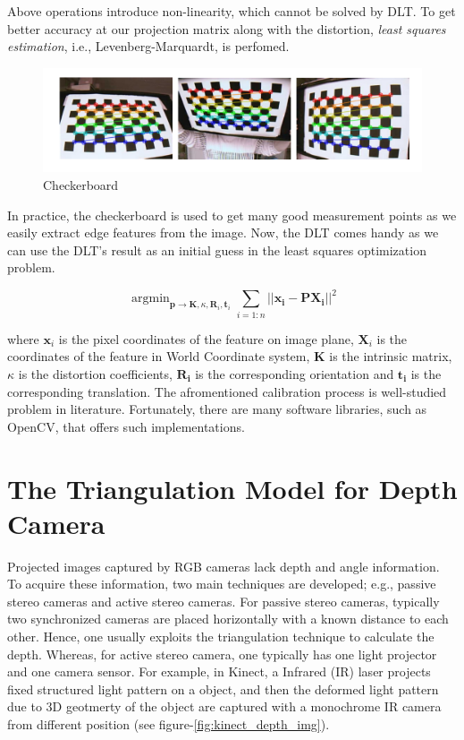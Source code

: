 \documentclass[a4paper]{report}
\numberwithin{figure}{section}
\newcommand{\argmin}{\mathop{\mathrm{argmin}}}
\begin{document}
Above operations introduce non-linearity, which cannot be solved by DLT.
To get better accuracy at our projection matrix along with the distortion, 
\textit{least squares estimation}, i.e., Levenberg-Marquardt, is perfomed.

\begin{figure}[H]
	\centering
  \includegraphics[width=\linewidth,natwidth=640,natheight=640]
  {fig/ref_imgs/checkerboard.png}
  \caption{Checkerboard}
  \label{fig:checkerboard}
\end{figure}

In practice, the checkerboard is used to get many good measurement points 
as  we easily extract edge features from the image. Now, the DLT comes handy
as we can use the DLT's result as an initial guess 
in the least squares optimization problem.

\begin{equation}
  \argmin_{\mathbf{p} \rightarrow \mathbf{K}, \kappa, \mathbf{R}_i, \mathbf{t}_i}
  \sum_{i=1:n} || \mathbf{x_{i}} - 
  \mathbf{P} \mathbf{X_{i}} ||^2
\end{equation}\label{eq:proj_lsq}

where 
$\mathbf{x}_i$ is the pixel coordinates of the feature on image plane,
$\mathbf{X}_i$ is the coordinates of the feature in World Coordinate system,
$\mathbf{K}$ is the intrinsic matrix, 
$\kappa$ is the distortion coefficients, 
$\mathbf{R_i}$ is the corresponding orientation and 
$\mathbf{t_i}$ is the corresponding translation.
The afromentioned calibration process is well-studied problem in literature. 
Fortunately, there are many software libraries, such as OpenCV, 
that offers such implementations.



\section{The Triangulation Model for Depth Camera} \label{sc_depth_model}

Projected images captured by RGB cameras lack depth and angle 
information. To acquire these information, two main techniques are developed; 
e.g., passive stereo cameras and active stereo cameras. For passive stereo cameras, 
typically two synchronized cameras are placed horizontally with a known distance to each other. 
Hence, one usually exploits the triangulation technique to calculate the depth. 
Whereas, for active stereo camera, one typically has one light projector and 
one camera sensor. For example, in Kinect, a Infrared (IR) laser projects 
fixed structured light pattern on a object, and then 
the deformed light pattern due to 3D geotmerty of the object are 
captured with a monochrome IR camera from different 
position (see figure-\ref{fig:kinect_depth_img}). 
\end{document}

